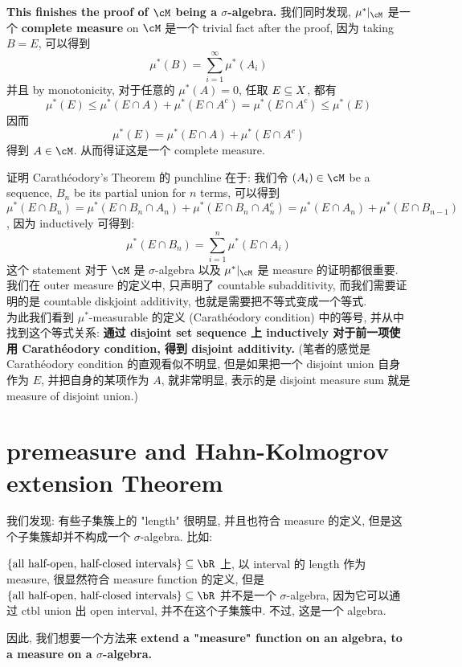 \documentclass[lang=cn,11pt]{elegantbook}
\begin{document}
\noindent\textbf{This finishes the proof of $\cM$ being a $\sigma$-algebra.} 我们同时发现,  $\mu^*|_\cM$ 是一个 \textbf{complete measure} on $\cM$ 是一个 trivial fact after the proof, 因为 taking $B = E$, 可以得到 
\begin{equation}
    \mu^*(B) = \sum_{i=1}^\infty \mu^*(A_i)
\end{equation}
\noindent 并且 by monotonicity, 对于任意的 $\mu^*(A) = 0$, 任取 $E \subseteq X$, 都有
\begin{equation}
    \mu^*(E )  \leq \mu^*(E \cap A) + \mu^*(E \cap A^c) = \mu^*(E \cap A^c) \leq \mu^*(E)
\end{equation}
因而
\[
\mu^*(E )  = \mu^*(E \cap A) + \mu^*(E \cap A^c)
\]
得到 $A \in \cM$. 从而得证这是一个 complete measure.\\

\begin{remark}
    证明 Carathéodory's Theorem 的 punchline 在于: 我们令 $(A_i) \in \cM$ be a sequence, $B_n$ be its partial union for $n$ terms, 可以得到$$\mu^*(E \cap B_n ) = \mu^*(E \cap B_n \cap A_n) + \mu^*(E \cap B_n \cap A_n^c) = \mu^*(E \cap A_n) + \mu^*(E \cap B_{n-1})$$, 因为 inductively 可得到:
\begin{equation}
    \mu^*(E \cap B_n) = \sum_{i=1}^n \mu^*(E \cap A_i)
\end{equation}
\noindent 这个 statement 对于 $\cM$ 是 $\sigma$-algebra 以及 $\mu^*|_{\cM}$ 是 measure 的证明都很重要. 我们在 outer measure 的定义中, 只声明了 countable subadditivity, 而我们需要证明的是 countable diskjoint additivity, 也就是需要把不等式变成一个等式. 
\\\noindent 为此我们看到 $\mu^*$-measurable 的定义 (Carathéodory condition) 中的等号, 并从中找到这个等式关系: \textbf{通过 disjoint set sequence 上 inductively 对于前一项使用 Carathéodory condition, 得到 disjoint additivity.} (笔者的感觉是 Carathéodory condition 的直观看似不明显, 但是如果把一个 disjoint union 自身作为 $E$, 并把自身的某项作为 $A$, 就非常明显, 表示的是 disjoint measure sum 就是 measure of disjoint union.)
\end{remark}


\chapter{premeasure and Hahn-Kolmogrov extension Theorem}
我们发现: 有些子集簇上的 "length" 很明显, 并且也符合 measure 的定义, 但是这个子集簇却并不构成一个 $\sigma$-algebra. 比如:
\begin{example}
    $\{ \text{all half-open, half-closed intervals}\} \sub \bR$ 上, 以 interval 的 length 作为 measure, 很显然符合 measure function 的定义, 但是 $\{ \text{all half-open, half-closed intervals}\} \sub \bR$ 并不是一个 $\sigma$-algebra, 因为它可以通过 ctbl union 出 open interval, 并不在这个子集簇中. 不过, 这是一个 algebra.\\
\end{example}
因此, 我们想要一个方法来 \textbf{extend a "measure" function on an algebra, to a measure on a $\sigma$-algebra.}
\end{document}
